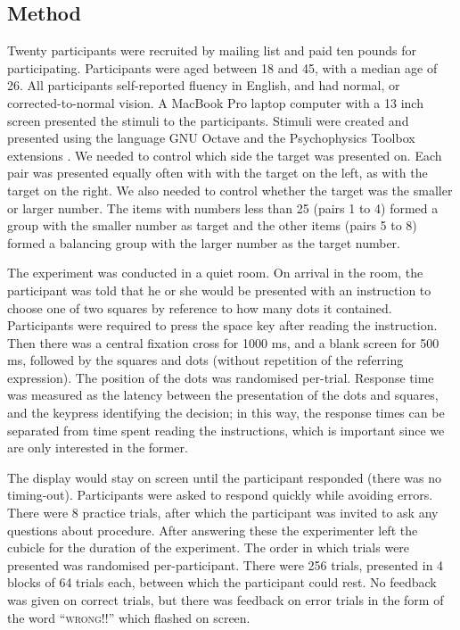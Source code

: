 \documentclass[graybox,envcountchap,sectrefs%
,footinfo
]{svmono}
\begin{document}

\subsection{Method}
Twenty participants were recruited by mailing list and paid ten pounds for participating. Participants were aged between 18 and 45, with a median age of 26. All participants self-reported fluency in English, and had normal, or corrected-to-normal vision. A MacBook Pro laptop computer with a 13 inch screen presented the stimuli to the participants. Stimuli were created and presented using the language GNU Octave \cite{eaton:2002} and the Psychophysics Toolbox extensions \cite{ptbx1, ptbx2}. We needed to control which side the target was presented on. Each pair was presented equally often with with the target on the left, as with the target on the right. We also needed to control whether the target was the smaller or larger number. The items with numbers less than 25 (pairs 1 to 4) formed a group with the smaller number as target and the other items (pairs 5 to 8) formed a balancing group with the larger number as the target number.

The experiment was conducted in a quiet room. On arrival in the room, the participant was told that he or she would be presented with an instruction to choose one of two squares by reference to how many dots it contained. Participants were required to press the space key after reading the instruction. Then there was a central fixation cross for 1000 ms, and a blank screen for 500 ms, followed by the squares and dots (without repetition of the referring expression).  The position of the dots was randomised per-trial. Response time was measured as the latency between the presentation of the dots and squares, and the keypress identifying the decision; in this way, the response times can be separated from time spent reading the instructions, which is important since we are only interested in the former.

The display would stay on screen until the participant responded (there was no timing-out). Participants were asked to respond quickly while avoiding errors. There were 8 practice trials, after which the participant was invited to ask any questions about procedure. After answering these the experimenter left the cubicle for the duration of the experiment. The order in which trials were presented was randomised per-participant. There were 256 trials, presented in 4 blocks of 64 trials each, between which the participant could rest. No feedback was given on correct trials, but there was feedback on error trials in the form of the word ``\textsc{wrong!!}'' which flashed on screen.
\end{document}
